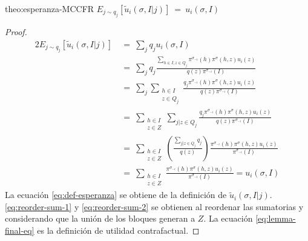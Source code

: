 \begin{reptheorem}{theo:esperanza-MCCFR}
$E_{j \sim q_j} [\tilde{u}_i(\sigma, I | j)]\ =\ u_i(\sigma, I)$
\end{reptheorem}

\begin{proof}
\begin{alignat}{2}
    E_{j \sim q_j}[\tilde{u}_i(\sigma, I | j)]\ & =\ \sum_{j} {q_j u_i(\sigma, I)} \\
    & =\ \sum_{j} { q_j \frac{\sum_{h \in I, z \in Q_j} \pi^{\sigma_{-i}}(h) \pi^{\sigma}(h, z) u_i(z)}{q(z) \pi^{\sigma_{-i}}(I)}} \\ \label{eq:def-esperanza}
    & =\ \sum_{j} \sum_{ \substack{h \in I \\ z \in Q_j}} \frac{q_j \pi^{\sigma_{-i}}(h) \pi^{\sigma}(h, z) u_i(z)}{ q(z) \pi^{\sigma_{-i}}(I)} \\ \label{eq:reorder-sum-1}
    & =\ \sum_{ \substack{h \in I \\ z \in Z} } \sum_{j | z \in Q_j} \frac{q_j \pi^{\sigma_{-i}}(h) \pi^{\sigma}(h, z) u_i(z)}{ q(z) \pi^{\sigma_{-i}}(I)} \\ \label{eq:reorder-sum-2}
    & =\ \sum_{ \substack{h \in I \\ z \in Z} } \left(\frac{\sum_{j | z \in Q_j} q_j }{q(z)}\right) \frac{\pi^{\sigma_{-i}}(h) \pi^{\sigma}(h, z) u_i(z)}{\pi^{\sigma_{-i}}(I)} \\
    & =\ \sum_{ \substack{h \in I \\ z \in Z} } \frac{\pi^{\sigma_{-i}}(h) \pi^{\sigma}(h, z) u_i(z)}{\pi^{\sigma_{-i}}(I)}  = u_i(\sigma, I) \label{eq:lemma-final-eq}
\end{alignat}
La ecuación \ref{eq:def-esperanza} se obtiene de la definición de $\tilde{u}_i(\sigma, I | j)$. \ref{eq:reorder-sum-1} y \ref{eq:reorder-sum-2} se obtienen al reordenar las sumatorias y considerando que la unión de los bloques generan a $Z$. La ecuación \ref{eq:lemma-final-eq} es la definición de utilidad contrafactual.
\end{proof}

